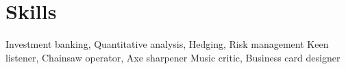 \section{Skills}
    \resumeSubHeadingListStart
        \resumeItemListStart
                    {Investment banking, Quantitative analysis, Hedging, Risk management}
                    {Keen listener, Chainsaw operator, Axe sharpener}
                    {Music critic, Business card designer}
            \resumeItemListEnd
    \resumeSubHeadingListEnd